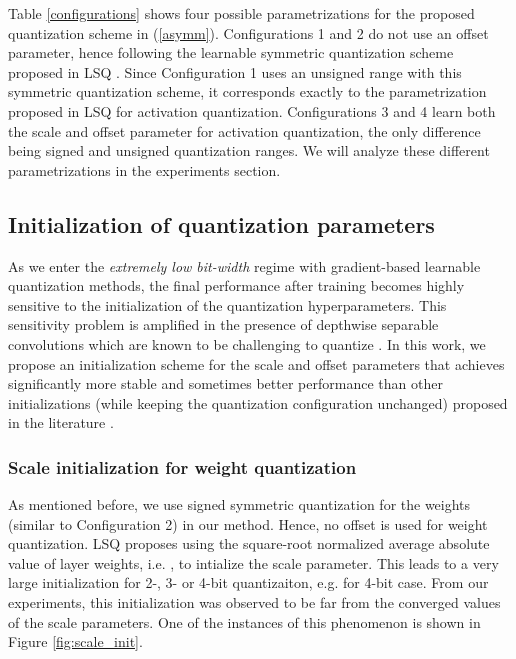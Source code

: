 \documentclass[10pt,twocolumn,letterpaper]{article}
\begin{document}
Table \ref{configurations} shows four possible parametrizations for the proposed quantization scheme in (\ref{asymm}). Configurations 1 and 2 do not use an offset parameter, hence following the learnable symmetric quantization scheme proposed in LSQ \cite{lsq}. Since Configuration 1 uses an unsigned range with this symmetric quantization scheme, it corresponds exactly to the parametrization proposed in LSQ for activation quantization. 
Configurations 3 and 4 learn both the scale and offset parameter for activation quantization, the only difference being signed and unsigned quantization ranges. We will analyze these different parametrizations in the experiments section. 












\subsection{Initialization of quantization parameters}
\label{sec:init}
As we enter the \textit{extremely low bit-width} regime with gradient-based learnable quantization methods, the final performance after training becomes highly sensitive to the initialization of the quantization hyperparameters. This sensitivity problem is amplified in the presence of depthwise separable convolutions which are known to be challenging to quantize \cite{haq}. In this work, we propose an initialization scheme for the scale and offset parameters that achieves significantly more stable and sometimes better performance than other initializations (while keeping the quantization configuration unchanged) proposed in the literature \cite{jacob2018cvpr, lsq}.


\subsubsection{Scale initialization for weight quantization} As mentioned before, we use signed symmetric quantization for the weights (similar to Configuration 2) in our method. Hence, no offset is used for weight quantization. LSQ \cite{lsq} proposes using the square-root normalized average absolute value of layer weights, i.e. , to intialize the scale parameter. This leads to a very large initialization for 2-, 3- or 4-bit quantizaiton, e.g.  for 4-bit case. From our experiments, this initialization was observed to be far from the converged values of the scale parameters. One of the instances of this phenomenon is shown in Figure \ref{fig:scale_init}.
\end{document}
